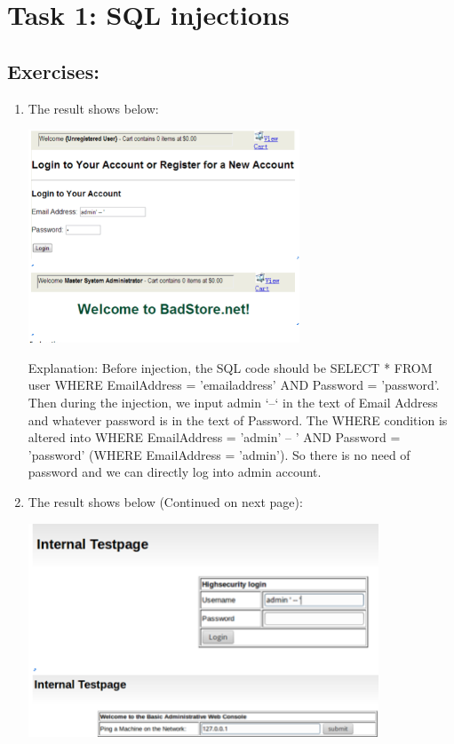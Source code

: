\section*{Task 1: SQL injections}

\subsection*{Exercises:}
\begin{enumerate}
\item The result shows below:
	\par 
	\begin{center}\includegraphics[height=2.5in]{sqli1}
	\end{center}
	Explanation: Before injection, the SQL code should be SELECT * FROM user WHERE EmailAddress = 'emailaddress’ AND Password = ’password’. Then during the injection, we input admin ‘--‘ in the text of Email Address and whatever password is in the text of Password. The WHERE condition is altered into WHERE EmailAddress = 'admin' -- ' AND 	Password = ’password’ (WHERE EmailAddress = 'admin'). So there is no need of password and we can directly log into admin account.
\item The result shows below (Continued on next page):
	\par
	\begin{center}\includegraphics[height=2.5in]{sqli2}

\end{center}
\end{enumerate}

